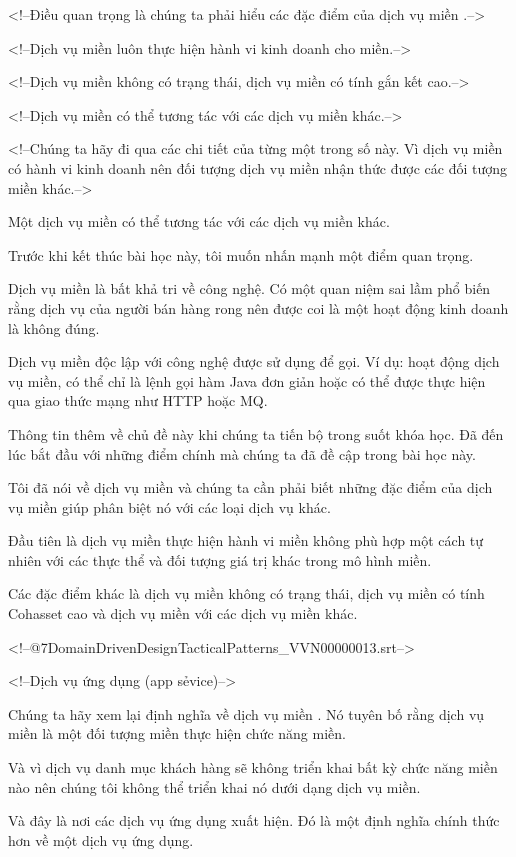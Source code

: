 <!--Điều quan trọng là chúng ta phải hiểu các đặc điểm của dịch vụ miền .-->

<!--Dịch vụ miền luôn thực hiện hành vi kinh doanh cho miền.-->

<!--Dịch vụ miền không có trạng thái, dịch vụ miền có tính gắn kết cao.-->

<!--Dịch vụ miền có thể tương tác với các dịch vụ miền khác.-->

<!--Chúng ta hãy đi qua các chi tiết của từng một trong số này. Vì dịch vụ miền có hành vi kinh doanh nên đối tượng dịch vụ miền nhận thức được các đối tượng miền khác.-->

Một dịch vụ miền có thể tương tác với các dịch vụ miền khác.

Trước khi kết thúc bài học này, tôi muốn nhấn mạnh một điểm quan trọng.

Dịch vụ miền là bất khả tri về công nghệ. Có một quan niệm sai lầm phổ biến rằng dịch vụ của người bán hàng rong nên được coi là một hoạt động kinh doanh là không đúng.

Dịch vụ miền độc lập với công nghệ được sử dụng để gọi. Ví dụ: hoạt động dịch vụ miền, có thể chỉ là lệnh gọi hàm Java đơn giản hoặc có thể được thực hiện qua giao thức mạng như HTTP hoặc MQ.

Thông tin thêm về chủ đề này khi chúng ta tiến bộ trong suốt khóa học. Đã đến lúc bắt đầu với những điểm chính mà chúng ta đã đề cập trong bài học này.

Tôi đã nói về dịch vụ miền và chúng ta cần phải biết những đặc điểm của dịch vụ miền giúp phân biệt nó với các loại dịch vụ khác.

Đầu tiên là dịch vụ miền thực hiện hành vi miền không phù hợp một cách tự nhiên với các thực thể và đối tượng giá trị khác trong mô hình miền.

Các đặc điểm khác là dịch vụ miền không có trạng thái, dịch vụ miền có tính Cohasset cao và dịch vụ miền với các dịch vụ miền khác.

<!--@\07DomainDrivenDesignTacticalPatterns_VVN\000000013.srt-->

<!--Dịch vụ ứng dụng (app sẻvice)-->

Chúng ta hãy xem lại định nghĩa về dịch vụ miền . Nó tuyên bố rằng dịch vụ miền là một đối tượng miền thực hiện chức năng miền.

Và vì dịch vụ danh mục khách hàng sẽ không triển khai bất kỳ chức năng miền nào nên chúng tôi không thể triển khai nó dưới dạng dịch vụ miền.

Và đây là nơi các dịch vụ ứng dụng xuất hiện. Đó là một định nghĩa chính thức hơn về một dịch vụ ứng dụng.

